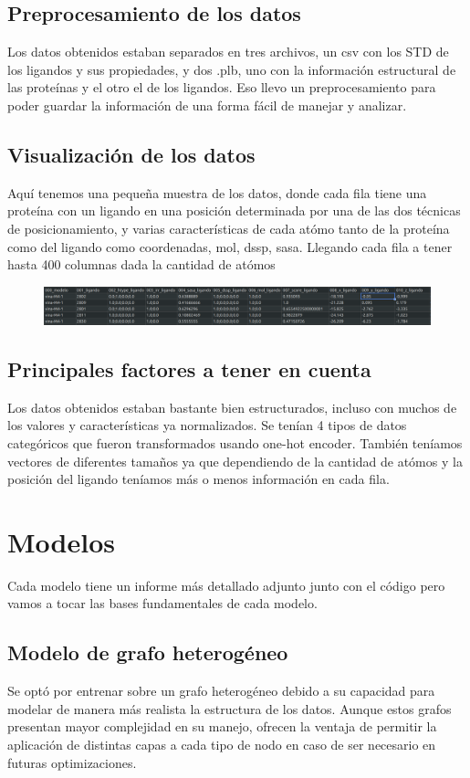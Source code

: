 \documentclass{article}
\begin{document}
\subsection{Preprocesamiento de los datos}
Los datos obtenidos estaban separados en tres archivos, un csv con los STD de los ligandos y sus propiedades, y dos .plb, uno con la información estructural de las proteínas y el otro el de los ligandos.
Eso llevo un preprocesamiento para poder guardar la información de una forma fácil de manejar y analizar.

\subsection{Visualización de los datos}
Aquí tenemos una pequeña muestra de los datos, donde cada fila tiene una proteína con un ligando en una posición determinada por una de las dos técnicas de posicionamiento, y varias características de cada
atómo tanto de la proteína como del ligando como coordenadas, mol, dssp, sasa. Llegando cada fila a tener hasta 400 columnas dada la cantidad de atómos
\begin{figure}[h]
    \centering
    \includegraphics[width=12cm]{data_example.png}
\end{figure}

\subsection{Principales factores a tener en cuenta}
Los datos obtenidos estaban bastante bien estructurados, incluso con muchos de los valores y características ya normalizados. Se tenían 4 tipos de datos categóricos que fueron transformados usando one-hot encoder.
También teníamos vectores de diferentes tamaños ya que dependiendo de la cantidad de atómos y la posición del ligando teníamos más o menos información en cada fila.

\newpage
\section{Modelos}
Cada modelo tiene un informe más detallado adjunto junto con el código pero vamos a tocar las bases fundamentales de cada modelo.
\subsection{Modelo de grafo heterogéneo}
Se optó por entrenar sobre un grafo heterogéneo debido a su capacidad para modelar de manera más realista la estructura de los datos.
Aunque estos grafos presentan mayor complejidad en su manejo, ofrecen la ventaja de permitir la aplicación de distintas capas a cada
tipo de nodo en caso de ser necesario en futuras optimizaciones.
\end{document}
